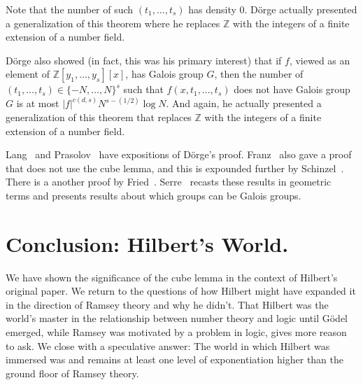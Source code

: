 \documentclass{article}
\theoremstyle{plain}
\theoremstyle{definition}
\newcommand{\Zed}{\mathbb{Z}}   %
\begin{document}
\noindent
Note that the number of such $(t_1,\ldots,t_s)$ has density 0.
D\"orge actually presented a generalization of this theorem where he replaces
$\Zed$ with the integers of a finite extension of a number field.


D\"orge also showed (in fact, this was his primary interest) that if $f$, viewed
as an element of $\Zed[y_1,\ldots,y_s][x]$, has 
Galois group $G$,
then the number of $(t_1,\ldots,t_s)\in \{-N,\ldots,N\}^s$ such that 
$f(x,t_1,\ldots,t_s)$ does not have Galois group $G$ is at most
$|f|^{c(d,s)}N^{s-(1/2)}\log N$. 
And again, he actually presented a generalization of this theorem 
that replaces
$\Zed$ with the integers of a finite extension of a number field.

Lang~\cite{diogeom,diogeomfund} and
Prasolov~\cite{polynomials} have expositions of D\"orge's proof.
Franz~\cite{Franz} also gave a proof that does not use the cube lemma,
and this is expounded further by Schinzel~\cite{polynomialssel}. There
is a another proof by Fried~\cite{fried}. 
Serre~\cite{serre} recasts these results in geometric terms and 
presents results about which groups can be Galois groups.










\section{Conclusion: Hilbert's World.}
\label{sec:conc}

We have shown the significance of the cube lemma in the context of
Hilbert's original paper. We return to the questions of how Hilbert might have
expanded it in the direction of Ramsey theory and why he didn't.  That Hilbert was
the world's master in the relationship between number theory and logic until G\"odel emerged, 
while Ramsey was motivated by a problem in logic, gives more reason to ask.
We close with a speculative answer: The world in which
Hilbert was immersed was and remains at least one level of exponentiation higher than the ground floor of Ramsey theory.
\end{document}
